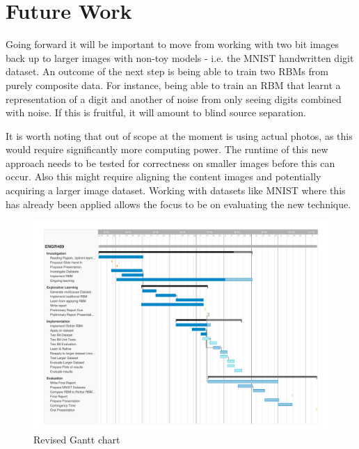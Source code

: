 

\chapter{Future Work}\label{C:Future Work}

Going forward it will be important to move from working with two bit images back up to larger images with non-toy models - i.e. the MNIST handwritten digit dataset.
An outcome of the next step is being able to train two RBMs from purely composite data. For instance, being able to train an RBM that learnt a representation of a digit and another of noise from only seeing digits combined with noise. If this is fruitful, it will amount to blind source separation.

It is worth noting that out of scope at the moment is using actual photos, as this would require significantly more computing power. The runtime of this new approach needs to be tested for correctness on smaller images before this can occur. Also this might require aligning the content images and potentially acquiring a larger image dataset. Working with datasets like MNIST where this has already been applied allows the focus to be on evaluating the new technique.

\begin{figure}
  \begin{center}
    \includegraphics[width=1\textwidth]{Assets/gantt}
    \caption{Revised Gantt chart}
   \label{F:gantt}
   \end{center}
\end{figure}





